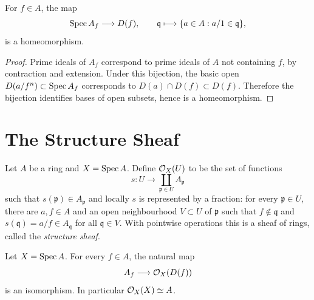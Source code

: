 \begin{proposition}
For \(f\in A\), the map
\[
    \operatorname{Spec} A_f\longrightarrow D(f),\qquad
    \mathfrak q\longmapsto \{a\in A:a/1\in\mathfrak q\},
\]
is a homeomorphism.
\end{proposition}

\begin{proof}
Prime ideals of \(A_f\) correspond to prime ideals of \(A\) not containing
\(f\), by contraction and extension.  Under this bijection, the basic open
\(D(a/f^n)\subset\operatorname{Spec} A_f\) corresponds to \(D(a)\cap D(f)\subset D(f)\).
Therefore the bijection identifies bases of open subsets, hence is a
homeomorphism.
\end{proof}

\section{The Structure Sheaf}

\begin{definition}
Let \(A\) be a ring and \(X=\operatorname{Spec} A\).  Define \(\mathcal{O}_X(U)\) to be the set of
functions
\[
    s:U\longrightarrow \coprod_{\mathfrak p\in U} A_{\mathfrak p}
\]
such that \(s(\mathfrak p)\in A_{\mathfrak p}\) and locally \(s\) is represented
by a fraction: for every \(\mathfrak p\in U\), there are \(a,f\in A\) and an
open neighbourhood \(V\subset U\) of \(\mathfrak p\) such that \(f\notin
\mathfrak q\) and \(s(\mathfrak q)=a/f\in A_{\mathfrak q}\) for all
\(\mathfrak q\in V\).  With pointwise operations this is a sheaf of rings,
called the \emph{structure sheaf}.
\end{definition}

\begin{proposition}
Let \(X=\operatorname{Spec} A\).  For every \(f\in A\), the natural map
\[
    A_f\longrightarrow \mathcal{O}_X(D(f))
\]
is an isomorphism.  In particular \(\mathcal{O}_X(X)\simeq A\).
\end{proposition}

